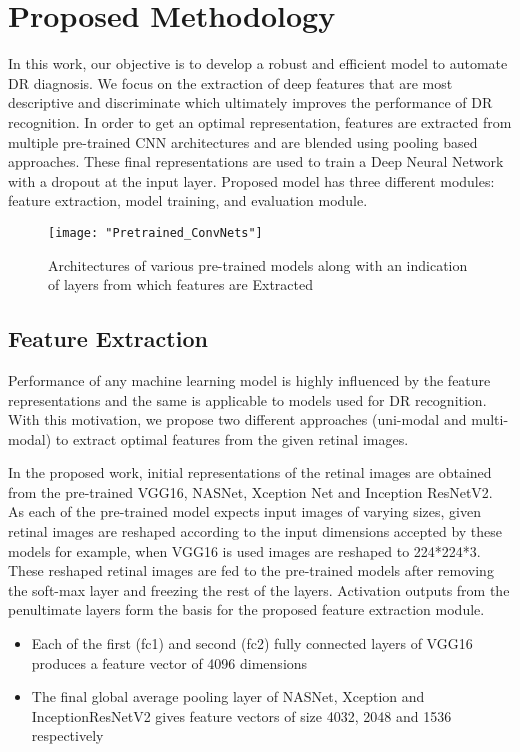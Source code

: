 \documentclass[electronics,article,accept ,moreauthors,pdftex]{mdpi}
\begin{document}
\section{Proposed Methodology}
In this work, our objective is to develop a robust and efficient model to automate DR diagnosis. We focus on the extraction of deep features that are most descriptive and discriminate which ultimately improves the performance of DR recognition. In order to get an optimal representation, features are extracted from multiple pre-trained CNN architectures and are blended using pooling based approaches. These final representations are used to train a Deep Neural Network with a dropout at the input layer. Proposed model has three different modules: feature extraction, model training, and evaluation module. 
\begin{figure}[H]
    \centering
    \texttt{[image: "Pretrained\_ConvNets"]}
    \caption{Architectures of various pre-trained models along with an indication of layers from which features are Extracted}
    \label{fig:pretrained_architectures}
\end{figure}

\subsection{Feature Extraction}
Performance of any machine learning model is highly influenced by the feature representations and the same is applicable to models used for DR recognition. With this motivation, we propose two different approaches (uni-modal and multi-modal) to extract optimal features from the given retinal images.




In the proposed work, initial representations of the retinal images are obtained from the pre-trained VGG16, NASNet, Xception Net and Inception ResNetV2. As each of the pre-trained model expects input  images of varying sizes, given retinal images are reshaped according to the input dimensions accepted by these models for example, when VGG16 is used images are reshaped to 224*224*3. These reshaped retinal images are fed to the pre-trained models after removing the soft-max layer and freezing the rest of the layers. 
Activation outputs from the penultimate layers form the basis for the proposed feature extraction module.
\begin{itemize}
\item Each of the first (fc1) and second (fc2) fully connected layers of VGG16 produces a feature vector of 4096 dimensions
\item The final global average pooling layer of NASNet, Xception and InceptionResNetV2 gives  feature vectors of size 4032, 2048 and 1536 respectively
\end{itemize}
\end{document}

